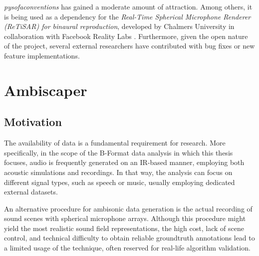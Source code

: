 \textit{pysofaconventions} has gained a moderate amount of attraction. Among others, it is being used as a dependency for the \textit{Real-Time Spherical Microphone Renderer (ReTiSAR) for binaural reproduction}, developed by Chalmers University in collaboration with Facebook Reality Labs \cite{helmholz2019real}. Furthermore, given the open nature of the project, several external researchers have contributed with bug fixes or new feature implementations.


\section{Ambiscaper}


\subsection{Motivation}

The availability of data is a fundamental requirement for research. 
More specifically, in the scope of the B-Format data analysis in which this thesis focuses, audio is frequently generated on an IR-based manner, employing both acoustic simulations and recordings. 
 In that way, the analysis can focus on different signal types, such as speech or music, usually employing dedicated external datasets. 

An alternative procedure for ambisonic data generation is the actual recording of sound scenes with spherical microphone arrays. 
Although this procedure might yield the most realistic sound field representations, the high cost, lack of scene control, and technical difficulty to obtain reliable groundtruth annotations lead to a limited usage of the technique, often reserved for real-life algorithm validation. 
 


